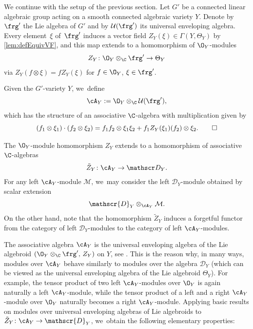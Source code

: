 We continue with the setup of the previous section. Let $G'$ be a connected linear algebraic group acting on a smooth connected algebraic variety $Y$. Denote by $\frg'$ the Lie algebra of $G'$ and by $\mathcal U(\frg')$ its universal enveloping algebra. Every element~$\xi$ of~$\frg'$ induces a vector field $Z_Y(\xi) \in \Gamma(Y,\Theta_Y)$ by \cref{lem:defEquivVF}, and this map extends to a homomorphism of $\O_Y$\nobreakdash-mod\-ules
\[
Z_Y \colon \O_Y \otimes_\C \frg' \to \Theta_Y
\]
via $Z_Y(f \otimes \xi) = f Z_Y(\xi)$ for $f \in \O_Y$, $\xi \in \frg'$.

\begin{dfn} \label{def:A}
Given the $G'$-variety $Y$, we~define
\[
\cA_Y := \O_Y \otimes_\C \mathcal U(\frg'),
\]
which has the structure of an associative $\C$-algebra with multiplication given by
\[
(f_1 \otimes \xi_1) \cdot (f_2 \otimes \xi_2) = f_1 f_2 \otimes \xi_1 \xi_2 + f_1 Z_Y(\xi_1)(f_2) \otimes \xi_2.\qedhere
\]
\end{dfn}

The $\O_Y$\nobreakdash-mod\-ule homomorphism $Z_Y$ extends to a homomorphism of associative $\C$-algebras
\[
\tilde{Z}_Y \colon \cA_Y \to \mathscr D_Y.
\]
For any left $\cA_Y$\nobreakdash-mod\-ule $\mathcal M$, we~may consider the left $\mathscr{D}_Y$\nobreakdash-mod\-ule obtained by scalar extension
\[
\mathscr{D}_Y \otimes_{\cA_Y} \mathcal{M}.
\]
On the other hand, note that the homomorphism $\tilde{Z}_Y$ induces a forgetful functor from the category of left $\mathscr{D}_Y$\nobreakdash-mod\-ules to the category of left $\cA_Y$\nobreakdash-mod\-ules.

The associative algebra $\cA_Y$ is the universal enveloping algebra of the Lie algebroid $(\O_Y \otimes_\C \frg',\, Z_Y)$ on $Y$, see \cite[1.8.4.\,Ex.]{BeilinsonBernstein_Jantzen}. This is the reason why, in many ways, modules over $\cA_Y$ behave similarly to modules over the algebra $\mathscr{D}_Y$ (which can be viewed as the universal enveloping algebra of the Lie algebroid $\Theta_Y$). For example, the tensor product of two left $\cA_Y$\nobreakdash-mod\-ules over $\O_Y$ is again naturally a left $\cA_Y$\nobreakdash-mod\-ule, while the tensor product of a left and a right $\cA_Y$\nobreakdash-mod\-ule over $\O_Y$ naturally becomes a right $\cA_Y$\nobreakdash-mod\-ule. Applying basic results on modules over universal enveloping algebras of Lie algebroids \cite[App.]{CN05} to $\tilde{Z}_Y \colon \cA_Y \to \mathscr{D}_Y$, we~obtain the following elementary properties:

